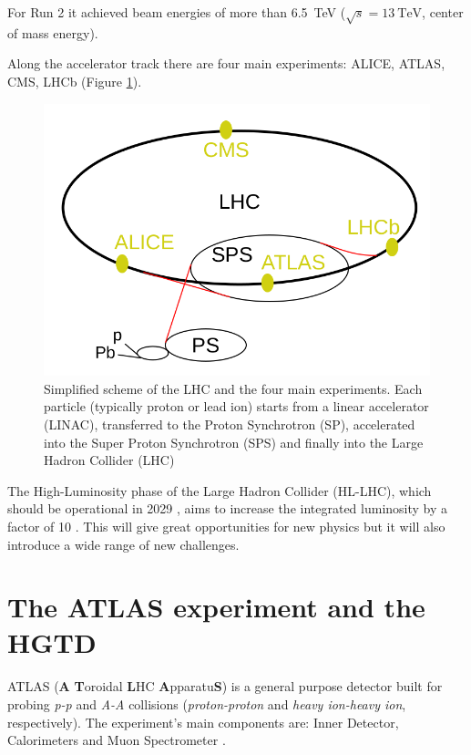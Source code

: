 For Run 2 it achieved beam energies of more than \qty{6.5}{\tera\electronvolt} ($\sqrt{s}=\qty{13}{\tera\electronvolt}$, center of mass energy).

Along the accelerator track there are four main experiments: ALICE, ATLAS, CMS, LHCb (Figure \ref{fig:LHC}).

\begin{figure}[!h]
    \centering
    \includegraphics[width=.8\textwidth]{Images/intro/LHC.png}
    \caption{Simplified scheme of the LHC and the four main experiments. Each particle (typically proton or lead ion) starts from a linear accelerator (LINAC), transferred to the Proton Synchrotron (SP), accelerated into the Super Proton Synchrotron  (SPS) and finally into the Large Hadron Collider (LHC)}
    \label{fig:LHC}
\end{figure}


The High-Luminosity phase of the Large Hadron Collider (HL-LHC), which should be operational in 2029 \cite{LS3_schedule_change}, aims to increase the integrated luminosity by a factor of 10 \cite{CERN-LHCC-2020-007}.
This will give great opportunities for new physics but it will also introduce a wide range of new challenges.



\section{The ATLAS experiment and the HGTD}

ATLAS (\textbf{A} \textbf{T}oroidal \textbf{L}HC \textbf{A}pparatu\textbf{S}) is a general purpose detector built for probing \textit{p-p} and \textit{A-A} collisions (\textit{proton-proton} and \textit{heavy ion-heavy ion}, respectively). 
The experiment's main components are: Inner Detector, Calorimeters and Muon Spectrometer \cite{Collaboration_The_ATLAS2008}.

